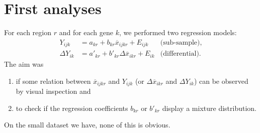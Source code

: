 \documentclass[a4paper, 11pt]{article}
\newcommand{\xb}{\overline{x}}
\newcommand{\Dxb}{\Delta \overline{x}}
\newcommand{\DY}{\Delta Y}
\begin{document}
\section{First analyses}

For each region $r$ and for each gene $k$, we performed two regression models:
\begin{align*}
  Y_{ijk} & = a_{kr} + b_{kr} \xb_{ijkr} + E_{ijk} & \text{(sub-sample)}, \\
  \DY_{ik} & = a'_{kr} + b'_{kr} \Dxb_{ikr} + E_{ik} & \text{(differential)}.
\end{align*}
The aim was 
\begin{enumerate}
\item if some relation between $\xb_{ijkr}$ and $Y_{ijk}$ (or $\Dxb_{ikr}$ and $\DY_{ik}$) can be observed by visual inspection and
\item to check if the regression coefficients $b_{kr}$ or $b'_{kr}$ display a mixture distribution.
\end{enumerate}
On the small dataset we have, none of this is obvious.
\end{document}

